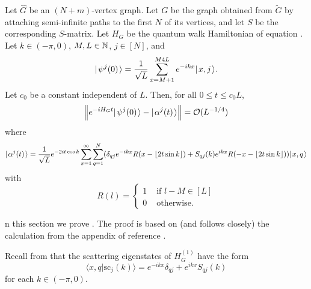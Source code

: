 \documentclass[../thesis-main/thesis-main]{subfiles}
\begin{document}
\begin{theorem} Let $\widehat{G}$ be an $(N+m)$-vertex graph.  Let $G$ be the graph obtained from $\widetilde{G}$ by attaching semi-infinite paths to the first $N$ of its vertices, and let $S$ be the corresponding $S$-matrix.  Let $H_G$ be the quantum walk Hamiltonian of equation . Let $k\in (-\pi,0)$, $M,L\in \mathbb{N}$, $j\in [N]$, and 
\begin{equation}
  |\mspace{2mu} \psi^j(0) \mspace{2mu} \rangle = \frac{1}{\sqrt{L}} \sum_{x=M+1}^{M4L} e^{-i k x} |\mspace{2mu} x,j \mspace{2mu} \rangle.
\end{equation}
Let $c_0$ be a constant independent of $L$.  Then, for all $0 \leq t \leq c_0 L$,
\begin{equation}
   \Big\|e^{-i H_G t}|\mspace{2mu} \psi^j(0) \mspace{2mu} \rangle - |\mspace{2mu} \alpha^j(t) \mspace{2mu} \rangle\Big\| = \mathcal{O}(L^{-1/4})
\end{equation}
where
\begin{equation}
  |\mspace{2mu} \alpha^j(t) \mspace{2mu} \rangle = \frac{1}{\sqrt{L}} e^{-2 i t \cos k} \sum_{x=1}^\infty \sum_{q=1}^N (\delta_{qj} e^{-ikx} R(x- \lfloor 2t \sin k\rfloor ) + S_{qj}(k) e^{ikx} R(-x - \lfloor 2t \sin k\rfloor ) ) |\mspace{2mu} x,q \mspace{2mu} \rangle
\end{equation}
with
\begin{equation}
  R(l) = \begin{cases} 1 & \text{ if } l- M \in [L]\\
    0 & \text{ otherwise.}
    \end{cases}
\end{equation}
\label{thm:SP_wavepacket}
\end{theorem}
n this section we prove . The proof is based on (and follows closely) the calculation from the appendix of reference \cite{FGG08}.

Recall from  that the scattering eigenstates of $H_{G}^{(1)}$ have the
form
\begin{equation}
\langle x,q|\text{sc}_{j}(k)\rangle=e^{-ikx}\delta_{qj}+e^{ikx}S_{qj}(k)\end{equation}
 for each $k\in(-\pi,0)$. 
\end{document}
